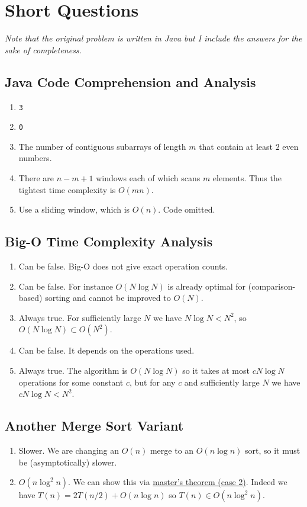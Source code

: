 \documentclass[12pt]{article}
\renewcommand{\t}{\texttt}
\begin{document}
\section{Short Questions}
\textit{Note that the original problem is written in Java but I include the answers for the sake of completeness.}
\subsection{Java Code Comprehension and Analysis}
\begin{enumerate}
\item \t{3}
\item \t{0}
\item The number of contiguous subarrays of length $m$ that contain at least $2$ even numbers.
\item There are $n-m+1$ windows each of which scans $m$ elements. Thus the tightest time complexity is $O(mn)$.
\item Use a sliding window, which is $O(n)$. Code omitted.
\end{enumerate}
\subsection{Big-O Time Complexity Analysis}
\begin{enumerate}
\item Can be false. Big-O does not give exact operation counts.
\item Can be false. For instance $O(N\log N)$ is already optimal for (comparison-based) sorting and cannot be improved to $O(N)$.
\item Always true. For sufficiently large $N$ we have $N\log N<N^2$, so $O(N\log N)\subset O(N^2)$.
\item Can be false. It depends on the operations used.
\item Always true. The algorithm is $O(N\log N)$ so it takes at most $cN\log N$ operations for some constant $c$, but for any $c$ and sufficiently large $N$ we have $cN\log N<N^2$.
\end{enumerate}
\subsection{Another Merge Sort Variant}
\begin{enumerate}
\item Slower. We are changing an $O(n)$ merge to an $O(n\log n)$ sort, so it must be (asymptotically) slower.
\item $O\left(n\log^2 n\right)$. We can show this via \href{https://en.wikipedia.org/wiki/Master_theorem_(analysis_of_algorithms)#Generic_form}{master's theorem (case 2)}. Indeed we have $T(n)=2T(n/2)+O(n\log n)$ so $T(n)\in O\left(n\log^2 n\right)$.
\end{enumerate}
\end{document}
